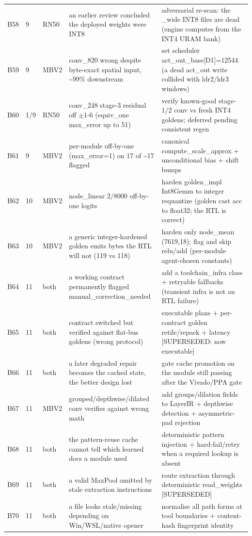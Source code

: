 \begin{footnotesize}
\begin{longtable}{@{}l l l p{} p{}@{}}
B58 & 9 & RN50 & an earlier review concluded the deployed weights were INT8 & adversarial re-scan: the \_wide INT8 files are dead (engine computes from the INT4 URAM bank) \\
B59 & 9 & MBV2 & conv\_820 wrong despite byte-exact spatial input, \textasciitilde{}99\% downstream & set scheduler act\_out\_base[D1]=12544 (a dead act\_out write collided with ldr2/ldr3 windows) \\
B60 & 1/9 & RN50 & conv\_248 stage-3 residual off $\pm1$-6 (equiv\_one max\_error up to 51) & verify known-good stage-1/2 conv vs fresh INT4 goldens; deferred pending consistent regen \\
B61 & 9 & MBV2 & per-module off-by-one (max\_error=1) on 17 of \textasciitilde{}17 flagged & canonical compute\_scale\_approx + unconditional bias + shift bumps \\
B62 & 10 & MBV2 & node\_linear 2/8000 off-by-one logits & harden golden\_impl Int8Gemm to integer requantize (golden cast acc to float32; the RTL is correct) \\
B63 & 10 & MBV2 & a generic integer-hardened golden emits bytes the RTL will not (119 vs 118) & harden only node\_mean (7619,18); flag and skip relu/add (per-module agent-chosen constants) \\
B64 & 11 & both & a working contract permanently flagged manual\_correction\_needed & add a toolchain\_infra class + retryable fallbacks (transient infra is not an RTL failure) \\
B65 & 11 & both & contract switched but verified against flat-bus goldens (wrong protocol) & executable plans + per-contract golden retile/repack + latency [SUPERSEDED: now executable] \\
B66 & 11 & both & a later degraded repair becomes the cached state, the better design lost & gate cache promotion on the module still passing after the Vivado/PPA gate \\
B67 & 11 & MBV2 & grouped/depthwise/dilated conv verifies against wrong math & add groups/dilation fields to LayerIR + depthwise detection + asymmetric-pad rejection \\
B68 & 11 & both & the pattern-reuse cache cannot tell which learned docs a module used & deterministic pattern injection + hard-fail/retry when a required lookup is absent \\
B69 & 11 & both & a valid MaxPool omitted by stale extraction instructions & route extraction through deterministic read\_weights [SUPERSEDED] \\
B70 & 11 & both & a file looks stale/missing depending on Win/WSL/native opener & normalise all path forms at tool boundaries + content-hash fingerprint identity \\

\end{longtable}
\end{footnotesize}
